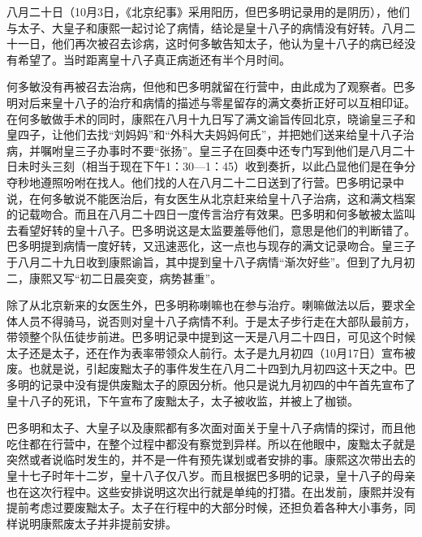 
八月二十日（10月3日，《北京纪事》采用阳历，但巴多明记录用的是阴历），他们与太子、大皇子和康熙一起讨论了病情，结论是皇十八子的病情没有好转。八月二十一日，他们再次被召去诊病，这时何多敏告知太子，他认为皇十八子的病已经没有希望了。当时距离皇十八子真正病逝还有半个月时间。



何多敏没有再被召去治病，但他和巴多明就留在行营中，由此成为了观察者。巴多明对后来皇十八子的治疗和病情的描述与零星留存的满文奏折正好可以互相印证。在何多敏做手术的同时，康熙在八月十九日写了满文谕旨传回北京，晓谕皇三子和皇四子，让他们去找“刘妈妈”和“外科大夫妈妈何氏”，并把她们送来给皇十八子治病，并嘱咐皇三子办事时不要“张扬”。皇三子在回奏中还专门写到他们是八月二十日未时头三刻（相当于现在下午1：30—1：45）收到奏折，以此凸显他们是在争分夺秒地遵照吩咐在找人。他们找的人在八月二十二日送到了行营。巴多明记录中说，在何多敏说不能医治后，有女医生从北京赶来给皇十八子治病，这和满文档案的记载吻合。而且在八月二十四日一度传言治疗有效果。巴多明和何多敏被太监叫去看望好转的皇十八子。巴多明说这是太监要羞辱他们，意思是他们的判断错了。巴多明提到病情一度好转，又迅速恶化，这一点也与现存的满文记录吻合。皇三子于八月二十九日收到康熙谕旨，其中提到皇十八子病情“渐次好些”。但到了九月初二，康熙又写“初二日晨突变，病势甚重”。



除了从北京新来的女医生外，巴多明称喇嘛也在参与治疗。喇嘛做法以后，要求全体人员不得骑马，说否则对皇十八子病情不利。于是太子步行走在大部队最前方，带领整个队伍徒步前进。巴多明记录中提到这一天是八月二十四日，可见这个时候太子还是太子，还在作为表率带领众人前行。太子是九月初四（10月17日）宣布被废。也就是说，引起废黜太子的事件发生在八月二十四到九月初四这十天之中。巴多明的记录中没有提供废黜太子的原因分析。他只是说九月初四的中午首先宣布了皇十八子的死讯，下午宣布了废黜太子，太子被收监，并被上了枷锁。



巴多明和太子、大皇子以及康熙都有多次面对面关于皇十八子病情的探讨，而且他吃住都在行营中，在整个过程中都没有察觉到异样。所以在他眼中，废黜太子就是突然或者说临时发生的，并不是一件有预先谋划或者安排的事。康熙这次带出去的皇十七子时年十二岁，皇十八子仅八岁。而且根据巴多明的记录，皇十八子的母亲也在这次行程中。这些安排说明这次出行就是单纯的打猎。在出发前，康熙并没有提前考虑过要废黜太子。太子在行程中的大部分时候，还担负着各种大小事务，同样说明康熙废太子并非提前安排。


